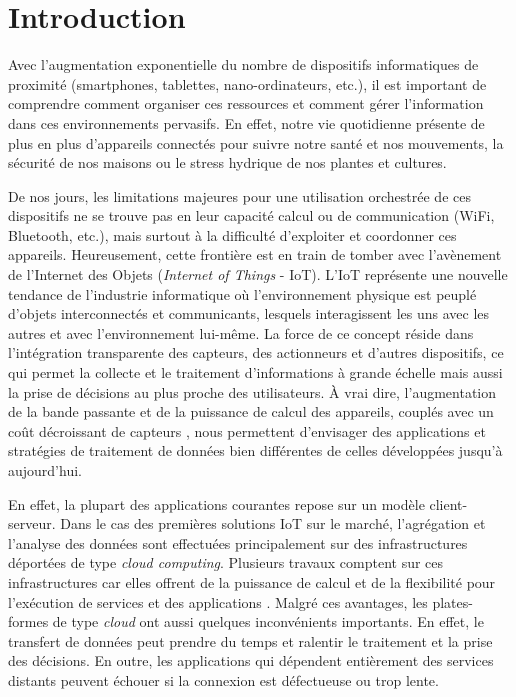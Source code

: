 

\begin{resume}
	
\end{resume}

\section{Introduction}

Avec l'augmentation exponentielle du nombre de dispositifs informatiques de proximité (smartphones, tablettes, nano-ordinateurs, etc.),  il est important de comprendre comment organiser ces ressources et comment gérer l'information dans ces environnements pervasifs. 
En effet, notre vie quotidienne présente de plus en plus d'appareils connectés pour suivre notre santé et nos mouvements, la sécurité de nos maisons ou le stress hydrique de nos plantes et cultures. 

De nos jours, les limitations majeures pour une utilisation orchestrée de ces dispositifs ne se trouve pas en leur capacité calcul ou de communication (WiFi, Bluetooth, etc.), mais surtout à la difficulté d'exploiter et coordonner ces appareils. Heureusement, cette frontière est en train de tomber avec l'avènement de l'Internet des Objets (\textit{Internet of Things} - IoT). L'IoT représente une nouvelle tendance de l'industrie informatique où l'environnement physique est peuplé d'objets interconnectés et communicants, lesquels interagissent les uns avec les autres et avec l'environnement lui-même. La force de ce concept réside dans l'intégration transparente des capteurs, des actionneurs et d'autres dispositifs, ce qui permet la collecte et le traitement d'informations à grande échelle mais aussi la prise de décisions au plus proche des utilisateurs. À vrai dire, l'augmentation de la bande passante et de la puissance de calcul des appareils, couplés avec un coût décroissant de capteurs \cite{Jones2014}, nous permettent d'envisager des applications et stratégies de traitement de données bien différentes de celles développées jusqu'à aujourd'hui.


En effet, la plupart des applications courantes repose sur un modèle client-serveur. Dans le cas des premières solutions IoT sur le marché, l'agrégation et l'analyse des données sont effectuées principalement sur des infrastructures déportées de type \textit{cloud computing}. Plusieurs travaux \cite{Miorandi2012, Gubbi2013, Fazio2015} comptent sur ces infrastructures car elles offrent de la puissance de calcul  et de la flexibilité pour l'exécution de services et des applications \cite{Serrano2013}. Malgré ces avantages, les plates-formes de type \textit{cloud} ont aussi quelques inconvénients importants. En effet, le transfert de données peut prendre du temps et ralentir le traitement et la prise des décisions. En outre, les applications qui dépendent entièrement des services distants peuvent échouer si la connexion est défectueuse ou trop lente.

